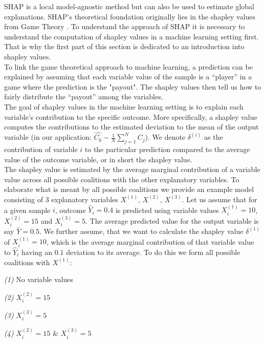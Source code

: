 \documentclass[12pt,titlepage]{article}
\begin{document}
SHAP is a local model-agnostic method but can also be used to estimate global explanations. SHAP's theoretical foundation originally lies in the shapley values from Game Theory \cite{shapley}. To understand the approach of SHAP it is necessary to understand the computation of shapley values in a machine learning setting first. That is why the first part of this section is dedicated to an introduction into shapley values. \\
To link the game theoretical approach to machine learning, a prediction can be explained by assuming that each variable value of the sample is a “player” in a game where the prediction is the "payout". The shapley values then tell us how to fairly distribute the “payout” among the variables. \\
The goal of shapley values in the machine learning setting is to explain each variable's contribution to the specific outcome. More specifically, a shapley value computes the contributions to the estimated deviation to the mean of the output variable (in our application: $\hat{C_{k}} - \frac{1}{N} \sum_{j=1}^{N} C_{j}$). We denote $\delta^{(i)}$ as the contribution of variable $i$ to the particular prediction compared to the average value of the outcome variable, or in short the shapley value. \\
The shapley value is estimated by the average marginal contribution of a variable value across all possible coalitions with the other explanatory variables. To elaborate what is meant by all possible coalitions we provide an example model consisting of 3 explanatory variables $X^{(1)}$, $X^{(2)}$, $X^{(3)}$. Let us assume that for a given sample $i$, outcome $\hat{Y}_{i}=0.4$ is predicted using variable values $X^{(1)}_{i}=10$, $X^{(2)}_{i}=15$ and $X^{(3)}_{i}=5$. The average predicted value for the output variable is say $\bar Y = 0.5$. We further assume, that we want to calculate the shapley value $\delta^{(1)}$ of $X^{(1)}_{i}=10$, which is the average marginal contribution of that variable value to $\hat{Y}_{i}$ having an $0.1$ deviation to its average. To do this we form all possible coalitions with $X^{(1)}$:

\vspace{3mm}
\textit{(1)} No variable values \par
\textit{(2)} $X^{(2)}_{i}=15$ \par
\textit{(3)} $X^{(3)}_{i}=5$\par
\textit{(4)} $X^{(2)}_{i}=15$ \& $X^{(3)}_{i}=5$ \\
\vspace{1mm}
\end{document}
